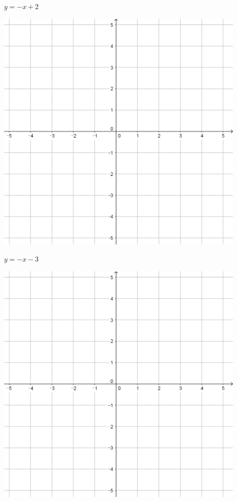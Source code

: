 \documentclass{oblivoir}
\begin{document}
\begin{minipage}{0.45\textwidth}\centering
\(y=-x+2\)
\par\bigskip\includegraphics[width=0.9\textwidth]{55}
\end{minipage}
\begin{minipage}{0.45\textwidth}\centering
\(y=-x-3\)
\par\bigskip\includegraphics[width=0.9\textwidth]{55}
\end{minipage}\bigskip\bigskip\par
\end{document}
